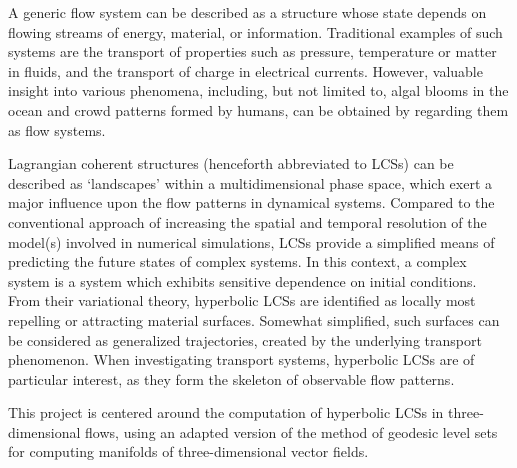 A generic flow system can be described as a structure whose state depends on
flowing streams of energy, material, or information. Traditional examples of
such systems are the transport of properties such as pressure, temperature or
matter in fluids, and the transport of charge in electrical currents. However,
valuable insight into various phenomena, including, but not limited to, algal
blooms in the ocean and crowd patterns formed by humans, can be obtained by
regarding them as flow systems.

Lagrangian coherent structures (henceforth abbreviated to LCSs) can be
described as `landscapes' within a multidimensional phase space, which exert a
major influence upon the flow patterns in dynamical systems. Compared to the
conventional approach of increasing the spatial and temporal resolution of the
model(s) involved in numerical simulations, LCSs provide a simplified means of
predicting the future states of complex systems. In this context, a complex
system is a system which exhibits sensitive dependence on initial conditions.
From their variational theory, hyperbolic LCSs are identified as locally most
repelling or attracting material surfaces. Somewhat simplified, such surfaces
can be considered as generalized trajectories, created by the underlying
transport phenomenon. When investigating transport systems, hyperbolic LCSs are
of particular interest, as they form the skeleton of observable flow patterns.

This project is centered around the computation of hyperbolic LCSs in
three-dimensional flows, using an adapted version of the method of geodesic
level sets for computing manifolds of three-dimensional vector fields.
